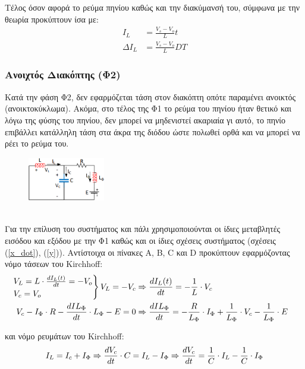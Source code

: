 \noindent\\\\
Τέλος όσον αφορά το ρεύμα πηνίου καθώς και την διακύμανσή του, σύμφωνα με την θεωρία προκύπτουν ίσα με:
\begin{align}
	I_L &= \frac{V_s - V_o}{L}t \label{I_L_1}\\	
	\Delta I_L &= \frac{V_s - V_o}{L} DT \label{DI_L_1}
\end{align}
\subsubsection{Ανοιχτός Διακόπτης (Φ2)}
\label{Phase_2}
\noindent
Κατά την φάση Φ2, δεν εφαρμόζεται τάση στον διακόπτη οπότε παραμένει ανοικτός (ανοικτοκύκλωμα). Ακόμα, στο τέλος της  Φ1 το ρεύμα του πηνίου ήταν θετικό και λόγω της φύσης του πηνίου, δεν μπορεί να μηδενιστεί ακαριαία γι αυτό, το πηνίο επιβάλλει κατάλληλη τάση στα άκρα της διόδου ώστε πολωθεί ορθά και να μπορεί να ρέει το ρεύμα του.
\begin{figure}[h]
	\centering
	\includegraphics[width=0.3\textwidth]{Images/Phase_2}
\end{figure}

\noindent\\
Για την επίλυση του συστήματος  και πάλι χρησιμοποιούνται οι ίδιες μεταβλητές εισόδου και εξόδου με την Φ1 καθώς και οι ίδιες σχέσεις συστήματος (σχέσεις (\ref{x_dot}), (\ref{y})).  Αντίστοιχα οι πίνακες A, B, C και D προκύπτουν εφαρμόζοντας νόμο τάσεων του Kirchhoff:
\begin{align}
	\begin{rcases}
		V_L = L \cdot \frac{dI_L(t)}{dt} = - V_o\\
		V_c = V_o
	\end{rcases} V_L = -V_c &\xRightarrow{} \frac{dI_L(t)}{dt} = -\frac{1}{L} \cdot V_c\\
	V_c - I_{\Phi} \cdot R - \frac{dIL_{\Phi}}{dt} \cdot L_{\Phi} - E = 0 &\xRightarrow{}  \frac{dIL_{\Phi}}{dt} = -\frac{R}{L_{\Phi}} \cdot I_{\Phi} + \frac{1}{L_{\Phi}} \cdot V_c - \frac{1}{L_{\Phi}} \cdot E
\end{align}

και	 νόμο ρευμάτων του Kirchhoff:
\begin{equation}
	I_L = I_c + I_{\Phi} \xRightarrow{} \frac{dV_c}{dt} \cdot C = I_L - I_{\Phi} \xRightarrow{} \frac{dV_c}{dt} = \frac{1}{C} \cdot I_L - \frac{1}{C} \cdot I_{\Phi}
\end{equation}


